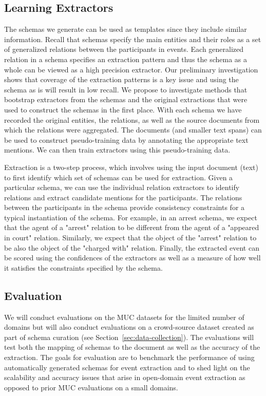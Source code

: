 \subsection{Learning Extractors}
The schemas we generate can be used as templates since they include similar information. Recall that schemas specify the main entities and their roles as a set of generalized relations between the participants in events. Each generalized relation in a schema specifies an extraction pattern and thus the schema as a whole can be viewed as a high precision extractor. Our preliminary investigation shows that coverage of the extraction patterns is a key issue and using the schema as is will result in low recall. We propose to investigate methods that bootstrap extractors from the schemas and the original extractions that were used to construct the schemas in the first place. With each schema we have recorded the original entities, the relations, as well as the source documents from which the relations were aggregated. The documents (and smaller text spans) can be used to construct pseudo-training data by annotating the appropriate text mentions. We can then train extractors using this pseudo-training data. 

Extraction is a two-step process, which involves using the input document (text) to first identify which set of schemas can be used for extraction. Given a particular schema, we can use the individual relation extractors to identify relations and extract candidate mentions for the participants. The relations between the participants in the schema provide consistency constraints for a typical instantiation of the schema. For example, in an arrest schema, we expect that the agent of a "arrest" relation to be different from the agent of a "appeared in court" relation. Similarly, we expect that the object of the "arrest" relation to be also the object of the "charged with" relation. Finally, the extracted event can be scored using the confidences of the extractors as well as a measure of how well it satisfies the constraints specified by the schema.

\subsection{Evaluation}

We will conduct evaluations on the MUC datasets for the limited number of domains but will also conduct evaluations on a crowd-source dataset created as part of schema curation (see Section~\ref{sec:data-collection}). The evaluations will test both the mapping of schemas to the document as well as the accuracy of the extraction. The goals for evaluation are to benchmark the performance of using automatically generated schemas for event extraction and to shed light on the scalability and accuracy issues that arise in open-domain event extraction as opposed to prior MUC evaluations on a small domains. 

